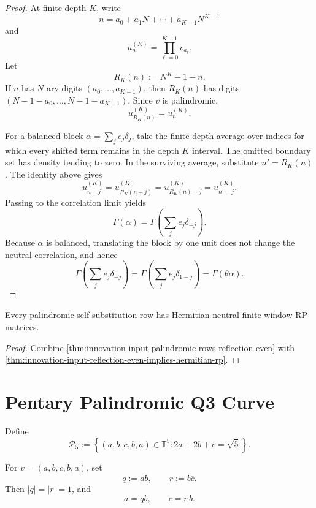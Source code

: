 \begin{proof}
At finite depth $K$, write
$$
n=a_0+a_1N+\cdots+a_{K-1}N^{K-1}
$$
and
$$
u_n^{(K)}=\prod_{\ell=0}^{K-1}v_{a_\ell}.
$$
Let
$$
R_K(n):=N^K-1-n.
$$
If $n$ has $N$-ary digits $(a_0,\ldots,a_{K-1})$, then $R_K(n)$ has
digits $(N-1-a_0,\ldots,N-1-a_{K-1})$. Since $v$ is palindromic,
$$
u_{R_K(n)}^{(K)}=u_n^{(K)}.
$$

For a balanced block $\alpha=\sum_j e_j\delta_j$, take the finite-depth
average over indices for which every shifted term remains in the depth
$K$ interval. The omitted boundary set has density tending to zero. In
the surviving average, substitute $n'=R_K(n)$. The identity above gives
$$
u_{n+j}^{(K)}
=
u_{R_K(n+j)}^{(K)}
=
u_{R_K(n)-j}^{(K)}
=
u_{n'-j}^{(K)}.
$$
Passing to the correlation limit yields
$$
\Gamma(\alpha)
=
\Gamma\left(\sum_j e_j\delta_{-j}\right).
$$
Because $\alpha$ is balanced, translating the block by one unit does not
change the neutral correlation, and hence
$$
\Gamma\left(\sum_j e_j\delta_{-j}\right)
=
\Gamma\left(\sum_j e_j\delta_{1-j}\right)
=
\Gamma(\theta\alpha).
$$
\end{proof}

\begin{corollary}
\label{cor:innovation-input-palindromic-hermitian-neutral-rp}
Every palindromic self-substitution row has Hermitian neutral
finite-window RP matrices.
\end{corollary}

\begin{proof}
Combine
\autoref{thm:innovation-input-palindromic-rows-reflection-even}
with
\autoref{thm:innovation-input-reflection-even-implies-hermitian-rp}.
\end{proof}

\section{Pentary Palindromic Q3 Curve}
\label{sec:innovation-input-pentary-palindromic-qthree-curve}

\begin{definition}
\label{def:innovation-input-pentary-palindromic-qthree-locus}
Define
$$
\mathcal P_5
:=
\left\{
(a,b,c,b,a)\in\mathbb T^5:
2a+2b+c=\sqrt5
\right\}.
$$
\end{definition}

\begin{definition}
\label{def:innovation-input-palindromic-edge-variables}
For $v=(a,b,c,b,a)$, set
$$
q:=a\overline b,
\qquad
r:=b\overline c.
$$
Then $|q|=|r|=1$, and
$$
a=qb,
\qquad
c=\overline r\,b.
$$
\end{definition}

